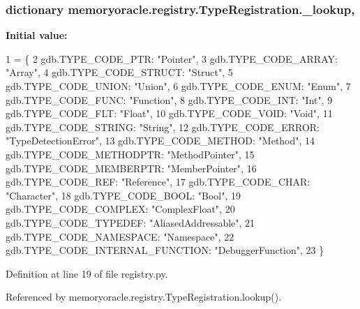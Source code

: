 \subsubsection[{\+\_\+lookup}]{\setlength{\rightskip}{0pt plus 5cm}dictionary memoryoracle.\+registry.\+Type\+Registration.\+\_\+lookup\hspace{0.3cm}{\ttfamily [static]}, {\ttfamily [private]}}\label{classmemoryoracle_1_1registry_1_1TypeRegistration_a08416d99733193baf2dec4208043c793}
{\bfseries Initial value\+:}
\begin{DoxyCode}
1 = \{
2         gdb.TYPE\_CODE\_PTR: \textcolor{stringliteral}{"Pointer"},
3         gdb.TYPE\_CODE\_ARRAY: \textcolor{stringliteral}{"Array"},
4         gdb.TYPE\_CODE\_STRUCT: \textcolor{stringliteral}{"Struct"},
5         gdb.TYPE\_CODE\_UNION: \textcolor{stringliteral}{"Union"},
6         gdb.TYPE\_CODE\_ENUM: \textcolor{stringliteral}{"Enum"},
7         gdb.TYPE\_CODE\_FUNC: \textcolor{stringliteral}{"Function"},
8         gdb.TYPE\_CODE\_INT: \textcolor{stringliteral}{"Int"},
9         gdb.TYPE\_CODE\_FLT: \textcolor{stringliteral}{"Float"},
10         gdb.TYPE\_CODE\_VOID: \textcolor{stringliteral}{"Void"},
11         gdb.TYPE\_CODE\_STRING: \textcolor{stringliteral}{"String"},
12         gdb.TYPE\_CODE\_ERROR: \textcolor{stringliteral}{"TypeDetectionError"},
13         gdb.TYPE\_CODE\_METHOD: \textcolor{stringliteral}{"Method"},
14         gdb.TYPE\_CODE\_METHODPTR: \textcolor{stringliteral}{"MethodPointer"},
15         gdb.TYPE\_CODE\_MEMBERPTR: \textcolor{stringliteral}{"MemberPointer"},
16         gdb.TYPE\_CODE\_REF: \textcolor{stringliteral}{"Reference"},
17         gdb.TYPE\_CODE\_CHAR: \textcolor{stringliteral}{"Character"},
18         gdb.TYPE\_CODE\_BOOL: \textcolor{stringliteral}{"Bool"},
19         gdb.TYPE\_CODE\_COMPLEX: \textcolor{stringliteral}{"ComplexFloat"},
20         gdb.TYPE\_CODE\_TYPEDEF: \textcolor{stringliteral}{"AliasedAddressable"},
21         gdb.TYPE\_CODE\_NAMESPACE: \textcolor{stringliteral}{"Namespace"},
22         gdb.TYPE\_CODE\_INTERNAL\_FUNCTION: \textcolor{stringliteral}{"DebuggerFunction"},
23     \}
\end{DoxyCode}


Definition at line 19 of file registry.\+py.



Referenced by memoryoracle.\+registry.\+Type\+Registration.\+lookup().

\hypertarget{classmemoryoracle_1_1registry_1_1TypeRegistration_a0f8bbbddaa054388c8c84efef397d967}{}
